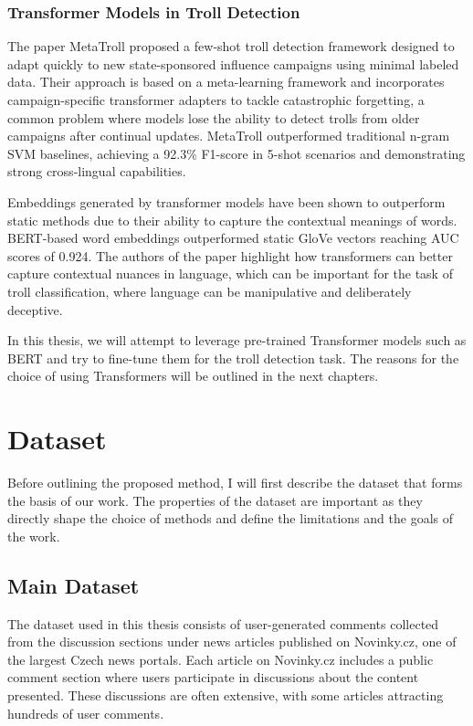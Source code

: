 \documentclass[twoside]{ctuthesis}
\theoremstyle{plain}
\theoremstyle{definition}
\theoremstyle{note}
\begin{document}
\subsection{Transformer Models in Troll Detection}
The paper MetaTroll\cite{Tian2023} proposed a few-shot troll detection framework designed to adapt quickly to new state-sponsored influence campaigns using minimal labeled data. Their approach is based on a meta-learning framework and incorporates campaign-specific transformer adapters to tackle catastrophic forgetting, a common problem where models lose the ability to detect trolls from older campaigns after continual updates. MetaTroll outperformed traditional n-gram SVM baselines, achieving a 92.3\% F1-score in 5-shot scenarios and demonstrating strong cross-lingual capabilities.\par
Embeddings generated by transformer models have been shown to outperform static methods due to their ability to capture the contextual meanings of words. BERT-based word embeddings outperformed static GloVe vectors reaching AUC scores of 0.924. The authors of the paper \cite{yilmaz2023} highlight how transformers can better capture contextual nuances in language, which can be important for the task of troll classification, where language can be manipulative and deliberately deceptive.

In this thesis, we will attempt to leverage pre-trained Transformer models such as BERT and try to fine-tune them for the troll detection task. The reasons for the choice of using Transformers will be outlined in the next chapters.\par

\chapter{Dataset}

Before outlining the proposed method, I will first describe the dataset that forms the basis of our work. The properties of the dataset are important as they directly shape the choice of methods and define the limitations and the goals of the work. \par

\section{Main Dataset}
The dataset used in this thesis consists of user-generated comments collected from the discussion sections under news articles published on Novinky.cz, one of the largest Czech news portals. Each article on Novinky.cz includes a public comment section where users participate in discussions about the content presented. These discussions are often extensive, with some articles attracting hundreds of user comments.\par
\end{document}
